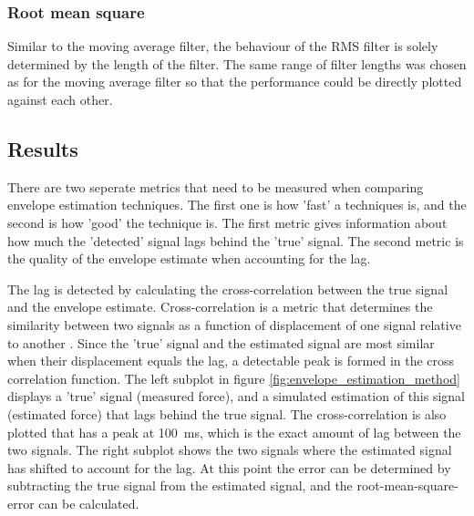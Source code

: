 \subsubsection{Root mean square}
Similar to the moving average filter, the behaviour of the RMS filter is solely determined by the length of the filter. The same range of filter lengths was chosen as for the moving average filter so that the performance could be directly plotted against each other.

\subsection{Results}
There are two seperate metrics that need to be measured when comparing envelope estimation techniques. The first one is how 'fast' a techniques is, and the second is how 'good' the technique is. The first metric gives information about how much the 'detected' signal lags behind the 'true' signal. The second metric is the quality of the envelope estimate when accounting for the lag. 

The lag is detected by calculating the cross-correlation between the true signal and the envelope estimate. Cross-correlation is a metric that determines the similarity between two signals as a function of displacement of one signal relative to another \cite{wiki:cross_correlation}. Since the 'true' signal and the estimated signal are most similar when their displacement equals the lag, a detectable peak is formed in the cross correlation function. The left subplot in figure \ref{fig:envelope_estimation_method} displays a 'true' signal (measured force), and a simulated estimation of this signal (estimated force) that lags behind the true signal. The cross-correlation is also plotted that has a peak at \SI{100}{\milli\second}, which is the exact amount of lag between the two signals. The right subplot shows the two signals where the estimated signal has shifted to account for the lag. At this point the error can be determined by subtracting the true signal from the estimated signal, and the root-mean-square-error can be calculated. 

